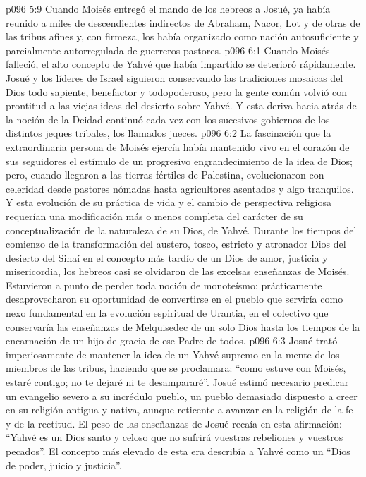 \vs p096 5:9 \pc Cuando Moisés entregó el mando de los hebreos a Josué, ya había reunido a miles de descendientes indirectos de Abraham, Nacor, Lot y de otras de las tribus afines y, con firmeza, los había organizado como nación autosuficiente y parcialmente autorregulada de guerreros pastores.
\vs p096 6:1 Cuando Moisés falleció, el alto concepto de Yahvé que había impartido se deterioró rápidamente. Josué y los líderes de Israel siguieron conservando las tradiciones mosaicas del Dios todo sapiente, benefactor y todopoderoso, pero la gente común volvió con prontitud a las viejas ideas del desierto sobre Yahvé. Y esta deriva hacia atrás de la noción de la Deidad continuó cada vez con los sucesivos gobiernos de los distintos jeques tribales, los llamados jueces.
\vs p096 6:2 La fascinación que la extraordinaria persona de Moisés ejercía había mantenido vivo en el corazón de sus seguidores el estímulo de un progresivo engrandecimiento de la idea de Dios; pero, cuando llegaron a las tierras fértiles de Palestina, evolucionaron con celeridad desde pastores nómadas hasta agricultores asentados y algo tranquilos. Y esta evolución de su práctica de vida y el cambio de perspectiva religiosa requerían una modificación más o menos completa del carácter de su conceptualización de la naturaleza de su Dios, de Yahvé. Durante los tiempos del comienzo de la transformación del austero, tosco, estricto y atronador Dios del desierto del Sinaí en el concepto más tardío de un Dios de amor, justicia y misericordia, los hebreos casi se olvidaron de las excelsas enseñanzas de Moisés. Estuvieron a punto de perder toda noción de monoteísmo; prácticamente desaprovecharon su oportunidad de convertirse en el pueblo que serviría como nexo fundamental en la evolución espiritual de Urantia, en el colectivo que conservaría las enseñanzas de Melquisedec de un solo Dios hasta los tiempos de la encarnación de un hijo de gracia de ese Padre de todos.
\vs p096 6:3 Josué trató imperiosamente de mantener la idea de un Yahvé supremo en la mente de los miembros de las tribus, haciendo que se proclamara: “como estuve con Moisés, estaré contigo; no te dejaré ni te desampararé”. Josué estimó necesario predicar un evangelio severo a su incrédulo pueblo, un pueblo demasiado dispuesto a creer en su religión antigua y nativa, aunque reticente a avanzar en la religión de la fe y de la rectitud. El peso de las enseñanzas de Josué recaía en esta afirmación: “Yahvé es un Dios santo y celoso que no sufrirá vuestras rebeliones y vuestros pecados”. El concepto más elevado de esta era describía a Yahvé como un “Dios de poder, juicio y justicia”.
